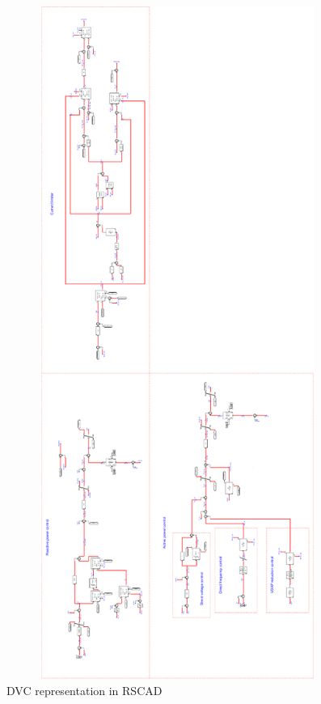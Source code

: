 \begin{figure}[H]
\centering
    \includegraphics[height = 22cm,width = 11.5cm]{Diagrams/Appendix_A/GSC_Control_RSCAD_2.pdf}
    \caption{DVC representation in RSCAD}
    \label{fig:GSC_Control_RSCAD_2}
\end{figure}